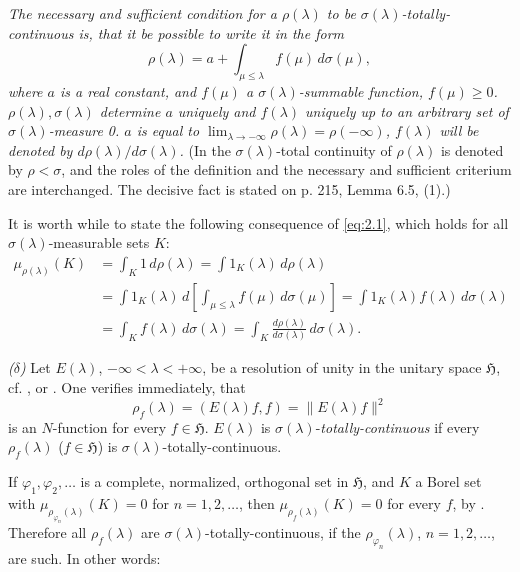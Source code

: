 \documentclass[b5paper,12pt,twoside]{article}
\numberwithin{equation}{section}
\theoremstyle{vnplain}
\theoremstyle{vndefinition}
\begin{document}
\emph{The necessary and sufficient condition for a $\rho(\lambda)$ to be
$\sigma(\lambda)$-totally-continuous is, that it be possible to write it in the
form}
\begin{equation}\label{eq:2.1}
\rho(\lambda)=a+\int_{\mu\leq\lambda}f(\mu)\,d\sigma(\mu),
\end{equation}
\emph{where $a$ is a real constant, and $f(\mu)$ a
$\sigma(\lambda)$-summable function, $f(\mu)\geq0$.
$\rho(\lambda),\sigma(\lambda)$ determine $a$ uniquely and $f(\lambda)$
uniquely up to an arbitrary set of $\sigma(\lambda)$-measure 0. $a$ is equal
to $\lim_{\lambda\to-\infty}\rho(\lambda)=\rho(-\infty)$,
$f(\lambda)$ will be denoted by $d\rho(\lambda)/d\sigma(\lambda)$.}
(In \cite{ref11} the $\sigma(\lambda)$-total continuity of
$\rho(\lambda)$ is denoted by $\rho<\sigma$, and the roles of the definition
and the necessary and sufficient criterium are interchanged. The decisive fact
is stated on p. 215, Lemma 6.5, (1).)

It is worth while to state the following consequence of \eqref{eq:2.1}, which
holds for all $\sigma(\lambda)$-measurable sets $K$:
\begin{align*}
\mu_{\rho(\lambda)}(K)
 &=\int_K1\,d\rho(\lambda)=\int1_K(\lambda)\,d\rho(\lambda)\\
 &=\int1_K(\lambda)\,d\left[\int_{\mu\leq\lambda}
        f(\mu)\,d\sigma(\mu)\right]
  =\int1_K(\lambda)f(\lambda)\,d\sigma(\lambda)\\
 &=\int_Kf(\lambda)\,d\sigma(\lambda)
  =\int_K\frac{d\rho(\lambda)}{d\sigma(\lambda)}\,d\sigma(\lambda).
\end{align*}

\noindent\textit{($\delta$)} Let $E(\lambda)$,
$-\infty<\lambda<+\infty$, be a resolution of unity in the unitary space
$\mathfrak H$, cf. \cite[p. 91]{ref1}, or
\cite[p. 174]{ref11}. One verifies immediately, that
\[
\rho_f(\lambda)=(E(\lambda)f,f)=\lVert E(\lambda)f\rVert^2
\]
is an $N$-function for every $f\in\mathfrak H$. $E(\lambda)$ is
$\sigma(\lambda)$-\emph{totally-continuous} if every $\rho_f(\lambda)$
($f\in\mathfrak H$) is $\sigma(\lambda)$-totally-continuous.

If $\varphi_1,\varphi_2,\ldots$ is a complete, normalized, orthogonal set in
$\mathfrak H$, and $K$ a Borel set with
$\mu_{\rho_{\varphi_n}(\lambda)}(K)=0$ for $n=1,2,\ldots$, then
$\mu_{\rho_f(\lambda)}(K)=0$ for every $f$, by
\mbox{\cite[p. 227, Theorem 6.3]{ref11}}. Therefore all $\rho_f(\lambda)$ are
$\sigma(\lambda)$-totally-continuous, if the
$\rho_{\varphi_n}(\lambda)$, $n=1,2,\ldots$, are such. In other words:
\end{document}
